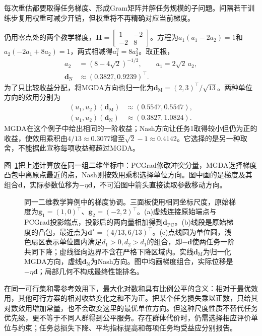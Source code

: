每次重估都要取得任务梯度、形成Gram矩阵并解任务规模的子问题。间隔若干训练步复用权重可减少开销，但权重将不再精确对应当前梯度。

仍用零点处的两个教学梯度，$\bm H=\left[\begin{smallmatrix}1&-2\\-2&8\end{smallmatrix}\right]$。方程为$a_1(a_1-2a_2)=1$和$a_2(-2a_1+8a_2)=1$，两式相减得$a_1^2=8a_2^2$。取正根，
\begin{align}
  a_2&=(8-4\sqrt2)^{-1/2},
  \qquad a_1=2\sqrt2\,a_2,
  \nonumber\\
  \bm d_{\mathrm N}&\approx(0.3827,0.9239)^{\top}.
\end{align}
为了只比较收益分配，将MGDA方向也归一化为$\bm d_{\mathrm M}=(2,3)^{\top}/\sqrt{13}$。两种单位方向的效用分别为
\begin{align}
  (u_1,u_2)(\bm d_{\mathrm M})
    &\approx(0.5547,0.5547),
  \nonumber\\
  (u_1,u_2)(\bm d_{\mathrm N})
    &\approx(0.3827,1.0824).
  \label{eq:ket-sharing-nash-numbers}
\end{align}
MGDA在这个例子中给出相同的一阶收益；Nash方向让任务1取得较小但仍为正的收益，使效用乘积由$4/13\approx0.3077$增至$\sqrt2-1\approx0.4142$。它选择的是另一种取舍，不能据此宣称每项收益都超过MGDA。

图~\ref{fig:ket-sharing-gradient-geometry}把上述计算放在同一组二维坐标中：PCGrad修改冲突分量，MGDA选择梯度凸包中离原点最近的点，Nash则按效用乘积选择单位方向。图中画的是梯度及其组合$\bm d$，实际参数位移为$-\eta\bm d$，不可沿图中箭头直接读取参数移动方向。

\begin{figure}[htbp]
  \centering
  
  \caption{同一二维教学算例中的梯度协调。三面板使用相同坐标尺度，原始梯度为$\bm g_1=(1,0)^{\top}$、$\bm g_2=(-2,2)^{\top}$。(a)虚线连接原始端点与PCGrad投影端点，投影后的两向量相加得到$\bm d_{\mathrm{PC}}$。(b)线段是原始梯度的凸包，最近点为$\bm d^\star=(4/13,6/13)^{\top}$。(c)点线圆为单位圆，浅色扇区表示单位圆内满足$d_1>0,d_2>d_1$的组合，即$-\bm d$使两任务一阶共同下降；虚线径向边界不含在严格下降区域内。实线$\bm d_{\mathrm M}$为归一化MGDA方向，虚线$\bm d_{\mathrm N}$为Nash方向。图中均画梯度组合，实际位移是$-\eta\bm d$；局部几何不构成最终性能排名。}
  \label{fig:ket-sharing-gradient-geometry}
\end{figure}
\FloatBarrier

在同一可行集和零参考效用下，最大化对数和具有比例公平的含义：相对于最优效用，其他可行方案的相对收益变化之和不为正。把某个任务损失乘以正数，只给其对数效用增加常量，也不会改变这里的最优单位方向。但这种尺度性质不替代任务优先级，更不等于不同人群得到公平服务。存在群体代价时，仍需选择相应评价单位与约束；任务总损失下降、平均指标提高和每项任务均受益应分别报告。

